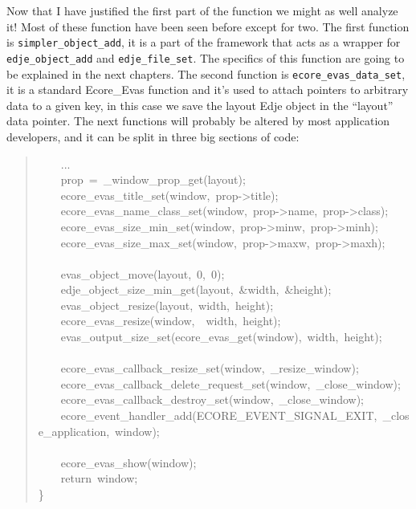 \documentclass[12pt,a4paper,english]{book}
\begin{document}
Now that I have justified the first part of the function we might as well
analyze it! Most of these function have been seen before except for two. The
first function is \texttt{simpler{\_}object{\_}add}, it is a part of the framework that
acts as a wrapper for \texttt{edje{\_}object{\_}add} and \texttt{edje{\_}file{\_}set}. The specifics
of this function are going to be explained in the next chapters. The second
function is \texttt{ecore{\_}evas{\_}data{\_}set}, it is a standard Ecore{\_}Evas function and
it's used to attach pointers to arbitrary data to a given key, in this case
we save the layout Edje object in the ``layout'' data pointer. The next functions
will probably be altered by most application developers, and it can be split
in three big sections of code:
\begin{quote}{\ttfamily \raggedright \noindent
~~~~...~\\
~~~~prop~=~{\_}window{\_}prop{\_}get(layout);~\\
~~~~ecore{\_}evas{\_}title{\_}set(window,~prop->title);~\\
~~~~ecore{\_}evas{\_}name{\_}class{\_}set(window,~prop->name,~prop->class);~\\
~~~~ecore{\_}evas{\_}size{\_}min{\_}set(window,~prop->minw,~prop->minh);~\\
~~~~ecore{\_}evas{\_}size{\_}max{\_}set(window,~prop->maxw,~prop->maxh);~\\
~\\
~~~~evas{\_}object{\_}move(layout,~0,~0);~\\
~~~~edje{\_}object{\_}size{\_}min{\_}get(layout,~{\&}width,~{\&}height);~\\
~~~~evas{\_}object{\_}resize(layout,~width,~height);~\\
~~~~ecore{\_}evas{\_}resize(window,~~width,~height);~\\
~~~~evas{\_}output{\_}size{\_}set(ecore{\_}evas{\_}get(window),~width,~height);~\\
~\\
~~~~ecore{\_}evas{\_}callback{\_}resize{\_}set(window,~{\_}resize{\_}window);~\\
~~~~ecore{\_}evas{\_}callback{\_}delete{\_}request{\_}set(window,~{\_}close{\_}window);~\\
~~~~ecore{\_}evas{\_}callback{\_}destroy{\_}set(window,~{\_}close{\_}window);~\\
~~~~ecore{\_}event{\_}handler{\_}add(ECORE{\_}EVENT{\_}SIGNAL{\_}EXIT,~{\_}close{\_}application,~window);~\\
~\\
~~~~ecore{\_}evas{\_}show(window);~\\
~~~~return~window;~\\
{\}}
}\end{quote}
\end{document}
